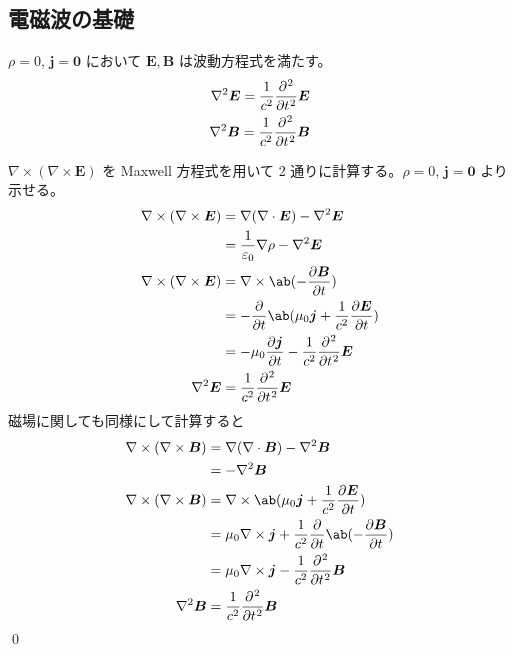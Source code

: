 \documentclass[uplatex,dvipdfmx,a4paper,11pt]{jlreq}
\makeatletter
\newcommand{\EE}{\bm{E}}
\newcommand{\BB}{\bm{B}}
\newcommand{\laplacian}{\nabla^2}
\numberwithin{equation}{section}
\theoremstyle{definition}
\renewenvironment{proof}[1][\proofname]{\par
  \normalfont
  \topsep6\p@\@plus6\p@ \trivlist
  \item[\hskip\labelsep{\bfseries #1}\@addpunct{\bfseries}]\ignorespaces\quad\par
}{%
  \qed\endtrivlist\@endpefalse
}
\renewcommand\proofname{証明}
\makeatother
\begin{document}
\subsection{電磁波の基礎}
\begin{proposition}
  $\rho = 0$, $\bm{j} = \bm{0}$ において $\EE, \BB$ は波動方程式を満たす。
  \begin{align}
    \nabla^2\EE = \frac{1}{c^2}\diffp[2]{}{t}\EE \\
    \nabla^2\BB = \frac{1}{c^2}\diffp[2]{}{t}\BB
  \end{align}
\end{proposition}
\begin{proof}
  $\nabla\times(\nabla\times\EE)$ を Maxwell 方程式を用いて 2 通りに計算する。$\rho = 0$, $\bm{j} = \bm{0}$ より示せる。
  \begin{align}
    \nabla\times(\nabla\times\EE) & = \nabla(\nabla\cdot\EE) - \laplacian\EE                     \\
                                  & = \frac{1}{\varepsilon_0}\nabla\rho - \laplacian\EE          \\
    \nabla\times(\nabla\times\EE) & = \nabla\times\ab(-\diffp{\BB}{t})                           \\
                                  & = -\diffp{}{t}\ab(\mu_0\bm{j} + \frac{1}{c^2}\diffp{\EE}{t}) \\
                                  & = -\mu_0\diffp{\bm{j}}{t} - \frac{1}{c^2}\diffp[2]{}{t}\EE   \\
    \nabla^2\EE                   & = \frac{1}{c^2}\diffp[2]{}{t}\EE
  \end{align}
  磁場に関しても同様にして計算すると
  \begin{align}
    \nabla\times(\nabla\times\BB) & = \nabla(\nabla\cdot\BB) - \laplacian\BB                                 \\
                                  & = - \laplacian\BB                                                        \\
    \nabla\times(\nabla\times\BB) & = \nabla\times\ab(\mu_0\bm{j} + \frac{1}{c^2}\diffp{\EE}{t})             \\
                                  & = \mu_0\nabla\times\bm{j} + \frac{1}{c^2}\diffp{}{t}\ab(-\diffp{\BB}{t}) \\
                                  & = \mu_0\nabla\times\bm{j} - \frac{1}{c^2}\diffp[2]{}{t}\BB               \\
    \nabla^2\BB                   & = \frac{1}{c^2}\diffp[2]{}{t}\BB
  \end{align}
\end{proof}
\end{document}
